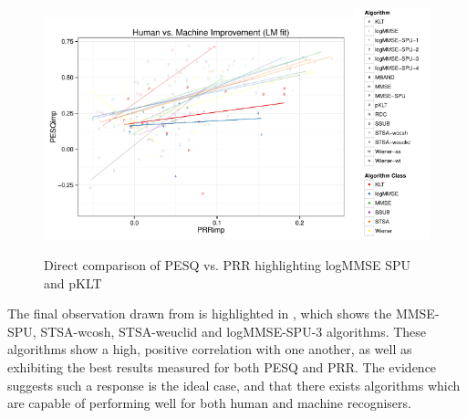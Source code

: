 \begin{figure}[h]
\noindent \begin{centering}
\includegraphics[width=0.8\textwidth]{fig/R/dir/pKLT-logMMSE-SPU-4/HumanMachineAllLM}\includegraphics[width=0.2\textwidth]{fig/R/dir/HumanMachineAllLegend}
\par\end{centering}

\protect\caption{\label{fig:direct-pklt-logmmse-spu-4}Direct comparison of \acs{PESQ}
vs. \acs{PRR} highlighting \acs{logMMSE} \acs{SPU} and \acs{pKLT}}
\end{figure}


The final observation drawn from  is highlighted
in , which shows the \ac{MMSE-SPU}, \ac{STSA-wcosh},
\ac{STSA-weuclid} and \ac{logMMSE-SPU-3} algorithms. These algorithms
show a high, positive correlation with one another, as well as exhibiting
the best results measured for both \ac{PESQ} and \ac{PRR}. The evidence
suggests such a response is the ideal case, and that there exists
algorithms which are capable of performing well for both human and
machine recognisers.

